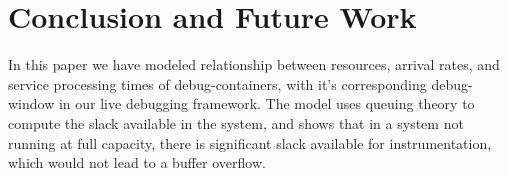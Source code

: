 \section{Conclusion and Future Work}
\label{sec:conclusion}

In this paper we have modeled relationship between resources, arrival rates, and service processing times of debug-containers, with it's corresponding debug-window in our live debugging framework.
The model uses queuing theory to compute the slack available in the system, and shows that in a system not running at full capacity, there is significant slack available for instrumentation, which would not lead to a buffer overflow. 